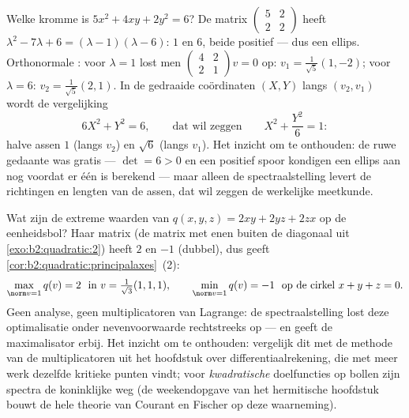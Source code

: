 \begin{example}\label{ex:b2:quadratic:ellipserun}
Welke kromme is $5x^2 + 4xy + 2y^2 = 6$? De matrix
$\begin{pmatrix} 5 & 2\\ 2 & 2\end{pmatrix}$ heeft  $\lambda^2 - 7\lambda + 6 = (\lambda - 1)(\lambda - 6)$:
 $1$ en $6$, beide positief --- dus een ellips.
Orthonormale : voor $\lambda = 1$ lost men
$\begin{pmatrix} 4 & 2\\ 2 & 1\end{pmatrix}v = 0$ op: $v_1 =
\frac{1}{\sqrt5}(1, -2)$; voor $\lambda = 6$: $v_2 =
\frac{1}{\sqrt5}(2, 1)$. In de gedraaide coördinaten $(X, Y)$ langs
$(v_2, v_1)$ wordt de vergelijking
\[
6X^2 + Y^2 = 6,
\qquad\text{dat wil zeggen}\qquad
X^2 + \frac{Y^2}{6} = 1 :
\]
halve assen $1$ (langs $v_2$) en $\sqrt6$ (langs $v_1$). Het
inzicht om te onthouden: de ruwe gedaante was gratis --- $\det = 6
> 0$ en een positief spoor kondigen een ellips aan nog voordat er
één  is berekend --- maar alleen de spectraalstelling
levert de richtingen en lengten van de assen, dat wil zeggen de
werkelijke meetkunde.
\end{example}

\begin{example}\label{ex:b2:quadratic:sphereextremes}
Wat zijn de extreme waarden van $q(x,y,z) = 2xy + 2yz + 2zx$ op de
eenheidsbol? Haar matrix (de matrix met enen buiten de diagonaal
uit \cref{exo:b2:quadratic:2}) heeft  $2$ en $-1$
(dubbel), dus geeft \cref{cor:b2:quadratic:principalaxes}~(2):
\[
\max_{\norm v = 1} q(v) = 2
\ \text{ in } v = \tfrac{1}{\sqrt3}(1,1,1),
\qquad
\min_{\norm v = 1} q(v) = -1
\ \text{ op de cirkel } x + y + z = 0 .
\]
Geen analyse, geen multiplicatoren van Lagrange: de
spectraalstelling lost deze optimalisatie onder nevenvoorwaarde
rechtstreeks op --- en geeft de maximalisator erbij. Het inzicht om
te onthouden: vergelijk dit met de methode van de multiplicatoren
uit het hoofdstuk over differentiaalrekening, die met meer werk
dezelfde kritieke punten vindt; voor \emph{kwadratische}
doelfuncties op bollen zijn spectra de koninklijke weg (de
weekendopgave van het hermitische hoofdstuk bouwt de hele theorie
van Courant en Fischer op deze waarneming).
\end{example}

